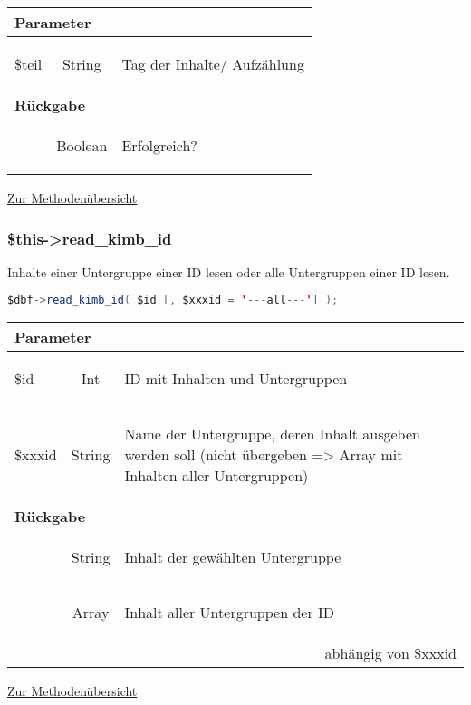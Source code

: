 \documentclass[paper=A4,pagesize=auto,12pt,headinclude=true,footinclude=true,BCOR=0mm,DIV=calc]{scrartcl}
\begin{document}
	     \begin{tabular}{|lcp{}|}
		    \hline
		      \multicolumn{3}{|l|}{ \textbf{Parameter} } \\
		    \hline
		      \$teil & String & \begin{itshape} Tag der Inhalte/ Aufzählung \end{itshape} \\
		    \hline
		      \multicolumn{3}{|l|}{ \textbf{Rückgabe} } \\
		    \hline
			     & Boolean & \begin{itshape} Erfolgreich? \end{itshape} \\
		    \hline
	    \end{tabular}
	    \begin{flushright} \small \hyperref[tab:methodenuerbersicht]{Zur Methodenübersicht} \end{flushright}
  
%  
  \subsubsection{\$this->read\_kimb\_id}
  \label{sec:mth_id}
	    Inhalte einer Untergruppe einer ID lesen oder alle Untergruppen einer ID lesen.
	    \begin{lstlisting}[gobble=4,language=Java]
	      $dbf->read_kimb_id( $id [, $xxxid = '---all---'] );
	    \end{lstlisting}
	    
	     \begin{tabular}{|lcp{}|}
		    \hline
		      \multicolumn{3}{|l|}{ \textbf{Parameter} } \\
		    \hline
		      \$id & Int & \begin{itshape} ID mit Inhalten und Untergruppen \end{itshape} \\
		      \$xxxid & String & \begin{itshape} Name der Untergruppe, deren Inhalt ausgeben werden soll (nicht übergeben => Array mit Inhalten aller Untergruppen)\end{itshape} \\
		    \hline
		      \multicolumn{3}{|l|}{ \textbf{Rückgabe} } \\
		    \hline
			  & String & \begin{itshape} Inhalt der gewählten Untergruppe  \end{itshape} \\
			  & Array & \begin{itshape} Inhalt aller Untergruppen der ID  \end{itshape} \\
			   \multicolumn{3}{|r|}{ abhängig von \$xxxid } \\
		    \hline
	    \end{tabular}
	    \begin{flushright} \small \hyperref[tab:methodenuerbersicht]{Zur Methodenübersicht} \end{flushright}
  
\end{document}
